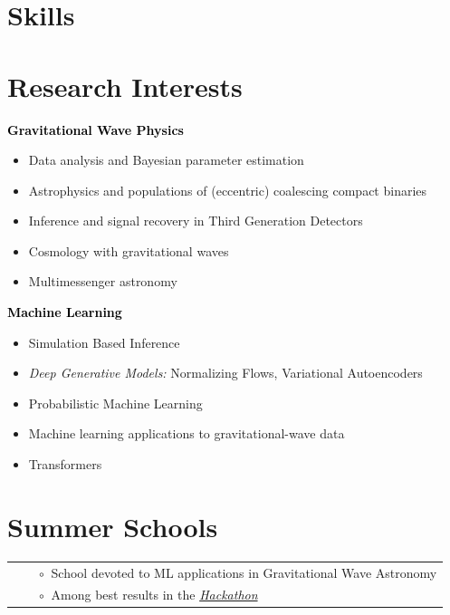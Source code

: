 \section{Skills}



\section{Research Interests}
\textbf{\textcolor{black}{Gravitational Wave Physics}}
\begin{itemize}[label=-, leftmargin=0.5cm]
    \item Data analysis and Bayesian parameter estimation
    \item Astrophysics and populations of (eccentric) coalescing compact binaries
    \item Inference and signal recovery in Third Generation Detectors
    \item Cosmology with gravitational waves
    \item Multimessenger astronomy
\end{itemize}
\medskip
\textbf{\textcolor{black}{Machine Learning}}
\begin{itemize}[label=-, leftmargin=0.5cm]
    \item Simulation Based Inference
    \item \textit{Deep Generative Models:} Normalizing Flows, Variational Autoencoders
    \item Probabilistic Machine Learning
    \item Machine learning applications to gravitational-wave data
    \item Transformers
\end{itemize}

\section{Summer Schools}
\begin{tabular}{rcl}
    &\hspace{0.4cm} &$\circ\;\;$School devoted to ML applications in Gravitational Wave Astronomy\\
    &\hspace{0.4cm} &$\circ\;\;$Among best results in the \href{https://github.com/niksterg/g2net_4th_training_school_thessaloniki_2023}{\textit{Hackathon}}\\
\end{tabular}


